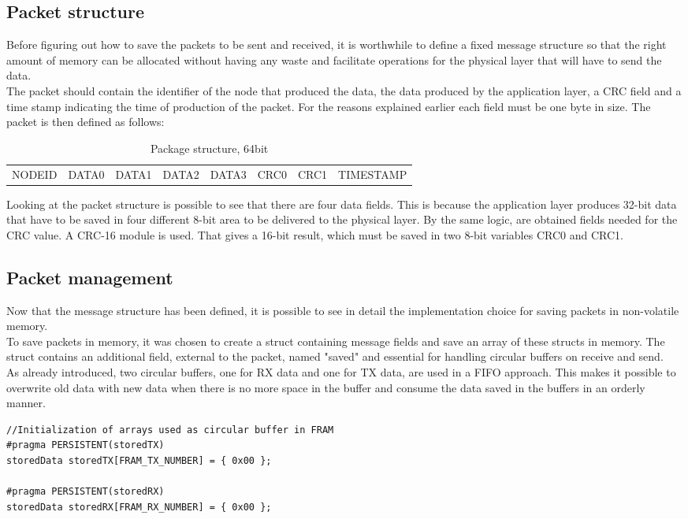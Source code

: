 \subsection{Packet structure}
Before figuring out how to save the packets to be sent and received, it is worthwhile to define a fixed message structure so that the right amount of memory can be allocated without having any waste and facilitate operations for the physical layer that will have to send the data.\\
The packet should contain the identifier of the node that produced the data, the data produced by the application layer, a CRC field and a time stamp indicating the time of production of the packet.
For the reasons explained earlier each field must be one byte in size. The packet is then defined as follows:

\begin{table}[H]
\begin{center}
\begin{tabular}{ |c| c| c| c| c| c| c| c|}
 NODEID & DATA0 & DATA1 & DATA2 & DATA3 & CRC0 & CRC1 & TIMESTAMP\\ 
\end{tabular}
\caption{\label{tab:Packet format}Package structure, 64bit}
\end{center}
\end{table}
Looking at the packet structure is possible to see that there are four data fields. This is because the application layer produces 32-bit data that have to be saved in four different 8-bit area to be delivered to the physical layer. By the same logic, are obtained fields needed for the CRC value. A CRC-16 module is used. That gives a 16-bit result, which must be saved in two 8-bit variables CRC0 and CRC1.\\

\subsection{Packet management}
Now that the message structure has been defined, it is possible to see in detail the implementation choice for saving packets in non-volatile memory.\\
To save packets in memory, it was chosen to create a struct containing message fields and save an array of these structs in memory. The struct contains an additional field, external to the packet, named "saved" and essential for handling circular buffers on receive and send.\\
As already introduced, two circular buffers, one for RX data and one for TX data, are used in a FIFO approach. This makes it possible to overwrite old data with new data when there is no more space in the buffer and consume the data saved in the buffers in an orderly manner.\\
\begin{lstlisting}
//Initialization of arrays used as circular buffer in FRAM
#pragma PERSISTENT(storedTX)
storedData storedTX[FRAM_TX_NUMBER] = { 0x00 };

#pragma PERSISTENT(storedRX)
storedData storedRX[FRAM_RX_NUMBER] = { 0x00 };
\end{lstlisting}


